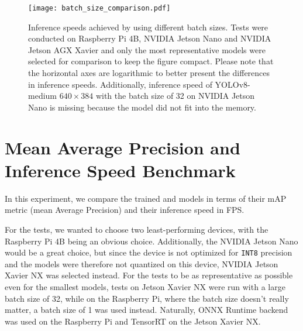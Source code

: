 
\begin{figure}[t]
    \begin{framed}
        \centering
        \texttt{[image: batch\_size\_comparison.pdf]}
        \caption{Inference speeds achieved by using different batch sizes. Tests
        were conducted on Raspberry Pi 4B, NVIDIA Jetson Nano and NVIDIA Jetson
        AGX Xavier and only the most representative models were selected for
        comparison to keep the figure compact. Please note that the horizontal
        axes are logarithmic to better present the differences in inference
        speeds. Additionally, inference speed of YOLOv8-medium $640 \times 384$
        with the batch size of 32 on NVIDIA Jetson Nano is missing because the
        model did not fit into the memory.}
        \label{BatchSizeComparison}
    \end{framed}
\end{figure}





\section{Mean Average Precision and Inference Speed Benchmark}
\label{FPSvsmAPComparison}

In this experiment, we compare the trained and models in terms of their mAP
metric (mean Average Precision) and their inference speed in FPS.

For the tests, we wanted to choose two least-performing devices, with the
Raspberry Pi 4B being an obvious choice. Additionally, the NVIDIA Jetson Nano
would be a great choice, but since the device is not optimized for \texttt{INT8}
precision and the models were therefore not quantized on this device, NVIDIA
Jetson Xavier NX was selected instead. For the tests to be as representative as
possible even for the smallest models, tests on Jetson Xavier NX were run with a
large batch size of 32, while on the Raspberry Pi, where the batch size doesn't
really matter, a batch size of 1 was used instead. Naturally, ONNX Runtime
backend was used on the Raspberry Pi and TensorRT on the Jetson Xavier NX.

